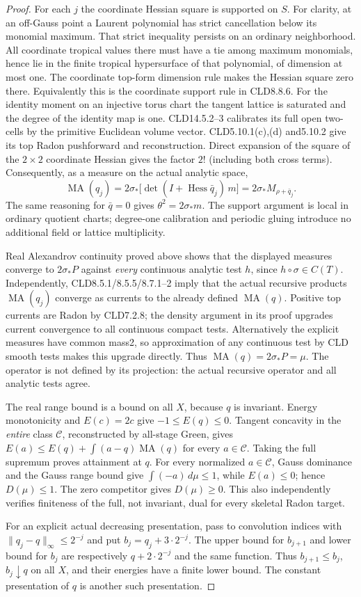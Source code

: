 \documentclass[11pt]{article}
\newcommand{\MA}{\operatorname{MA}}
\newcommand{\C}{\mathcal C}
\begin{document}
\begin{proof}
For each $j$ the coordinate Hessian square is supported on $S$.
For clarity, at an off-Gauss point a Laurent polynomial has strict
cancellation below its monomial maximum. That strict inequality
persists on an ordinary neighborhood. All coordinate tropical values
there must have a tie among maximum monomials, hence lie in the finite
tropical hypersurface of that polynomial, of dimension at most one.
The coordinate top-form dimension rule makes the Hessian square zero
there. Equivalently this is the coordinate support rule in CLD8.8.6.
For the identity moment on an injective torus chart the tangent lattice
is saturated and the degree of the identity map is one. CLD14.5.2--3
calibrates its full open two-cells by the primitive Euclidean volume
vector. CLD5.10.1(c),(d) and5.10.2 give its top Radon pushforward and
reconstruction. Direct expansion of the square of the $2\times2$
coordinate Hessian gives the factor $2!$ (including both cross terms).
Consequently, as a measure on the actual analytic space,
\[
 \MA(q_j)=2\sigma_*\bigl[\det(I+\operatorname{Hess}\bar q_j)\,m\bigr]
 =2\sigma_*M_{\rho+\bar q_j}.
\]
The same reasoning for $\bar q=0$ gives $\theta^2=2\sigma_*m$.
The support argument is local in ordinary quotient charts; degree-one
calibration and periodic gluing introduce no additional field or
lattice multiplicity.

Real Alexandrov continuity proved above shows that the displayed
measures converge to $2\sigma_*P$ against \emph{every} continuous
analytic test $h$, since $h\circ\sigma\in C(T)$. Independently,
CLD8.5.1/8.5.5/8.7.1--2 imply that the actual recursive products
$\MA(q_j)$ converge as currents to the already defined $\MA(q)$.
Positive top currents are Radon by CLD7.2.8; the density argument in
its proof upgrades current convergence to all continuous compact tests.
Alternatively the explicit measures have common mass2, so approximation
of any continuous test by CLD smooth tests makes this upgrade directly.
Thus $\MA(q)=2\sigma_*P=\mu$. The operator is not defined by its
projection: the actual recursive operator and all analytic tests agree.

The real range bound is a bound on all $X$, because $q$ is invariant.
Energy monotonicity and $E(c)=2c$ give $-1\le E(q)\le0$.
Tangent concavity in the \emph{entire} class $\C$, reconstructed
by all-stage Green, gives
$E(a)\le E(q)+\int(a-q)\MA(q)$ for every $a\in\C$.
Taking the full supremum proves attainment at $q$.
For every normalized $a\in\C$, Gauss dominance and the Gauss range
bound give $\int(-a)\,d\mu\le1$, while $E(a)\le0$; hence
$D(\mu)\le1$. The zero competitor gives $D(\mu)\ge0$.
This also independently verifies finiteness of the full, not invariant,
dual for every skeletal Radon target.

For an explicit actual decreasing presentation, pass to convolution
indices with $\|q_j-q\|_\infty\le2^{-j}$ and put
$b_j=q_j+3\cdot2^{-j}$. The upper bound for $b_{j+1}$ and lower
bound for $b_j$ are respectively $q+2\cdot2^{-j}$ and the same
function. Thus $b_{j+1}\le b_j$, $b_j\downarrow q$ on all $X$,
and their energies have a finite lower bound. The constant presentation
of $q$ is another such presentation.
\end{proof}
\end{document}
